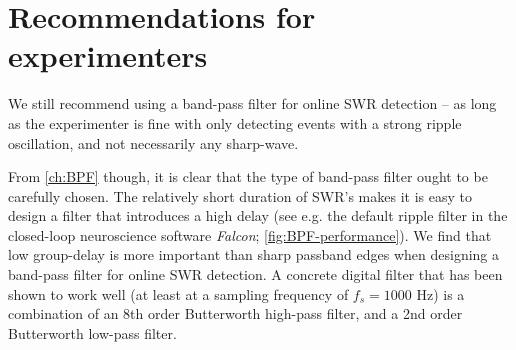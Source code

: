 \section{Recommendations for experimenters}
\label{sec:recommend}

We still recommend using a band-pass filter for online SWR detection -- as long as the experimenter is fine with only detecting events with a strong ripple oscillation, and not necessarily any sharp-wave.

From \cref{ch:BPF} though, it is clear that the type of band-pass filter ought to be carefully chosen. The relatively short duration of SWR's makes it is easy to design a filter that introduces a high delay (see e.g. the default ripple filter in the closed-loop neuroscience software \emph{Falcon}; \cref{fig:BPF-performance}). We find that low group-delay is more important than sharp passband edges when designing a band-pass filter for online SWR detection. A concrete digital filter that has been shown to work well (at least at a sampling frequency of $f_s = 1000$ Hz) is a combination of an 8th order Butterworth high-pass filter, and a 2nd order Butterworth low-pass filter.
